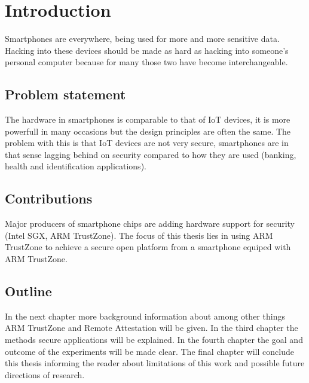 \documentclass{report}
\begin{document}
\chapter{Introduction}

Smartphones are everywhere, being used for more and more sensitive data. Hacking into these devices should be made as hard as hacking into someone's personal computer because for many those two have become interchangeable.

\section{Problem statement}

The hardware in smartphones is comparable to that of IoT devices, it is more powerfull in many occasions but the design principles are often the same. The problem with this is that IoT devices are not very secure, smartphones are in that sense lagging behind on security compared to how they are used (banking, health and identification applications).

\section{Contributions}

Major producers of smartphone chips are adding hardware support for security (Intel SGX, ARM TrustZone). The focus of this thesis lies in using ARM TrustZone to achieve a secure open platform from a smartphone equiped with ARM TrustZone.

\section{Outline}

In the next chapter more background information about among other things ARM TrustZone and Remote Attestation will be given. In the third chapter the methods secure applications will be explained. In the fourth chapter the goal and outcome of the experiments will be made clear. The final chapter will conclude this thesis informing the reader about limitations of this work and possible future directions of research.
\end{document}
